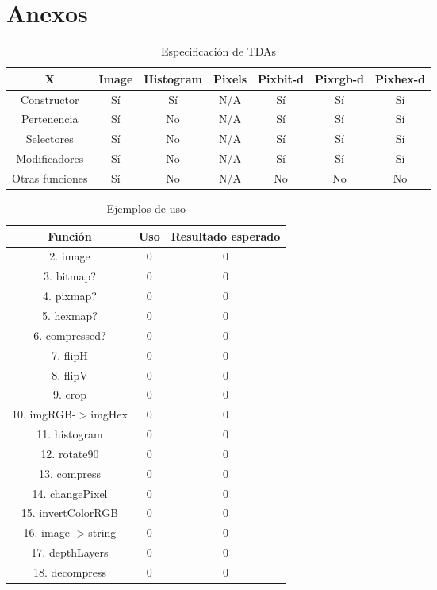 \section*{Anexos}

\begin{table}[H]
    \begin{center}
    \begin{tabular}{| c | c | c | c | c | c | c | }
    \hline
    X & Image & Histogram & Pixels & Pixbit-d & Pixrgb-d & Pixhex-d \\ \hline
    Constructor & Sí & Sí & N/A & Sí & Sí & Sí \\
    Pertenencia & Sí & No & N/A & Sí & Sí & Sí \\
    Selectores & Sí & No & N/A & Sí & Sí & Sí \\
    Modificadores & Sí & No & N/A & Sí & Sí & Sí \\
    Otras funciones & Sí & No & N/A & No & No & No \\ \hline
    \end{tabular}
    \caption{Especificación de TDAs}
    \label{tab:TDAs}
    \end{center}
\end{table}


\begin{table}[H]
    \begin{center}
    \begin{tabular}{|c|c|c|}
    \hline
    Función & Uso & Resultado esperado \\ \hline
    2. image & 0 & 0 \\ \hline
    3. bitmap? & 0 & 0 \\ \hline
    4. pixmap? & 0 & 0 \\ \hline
    5. hexmap? & 0 & 0 \\ \hline
    6. compressed? & 0 & 0 \\ \hline
    7. flipH & 0 & 0 \\ \hline
    8. flipV & 0 & 0 \\ \hline
    9. crop & 0 & 0 \\ \hline
    10. imgRGB-$>$imgHex & 0 &  0 \\ \hline
    11. histogram & 0 & 0 \\ \hline
    12. rotate90 & 0 & 0 \\ \hline
    13. compress & 0 & 0 \\ \hline
    14. changePixel & 0 & 0 \\ \hline
    15. invertColorRGB & 0 & 0 \\ \hline
    16. image-$>$string & 0 & 0 \\ \hline
    17. depthLayers & 0 & 0 \\  \hline
    18. decompress & 0 & 0 \\ \hline
    \end{tabular}
    \caption{Ejemplos de uso}
    \label{tab:Ejemplos}
    \end{center}
\end{table}


